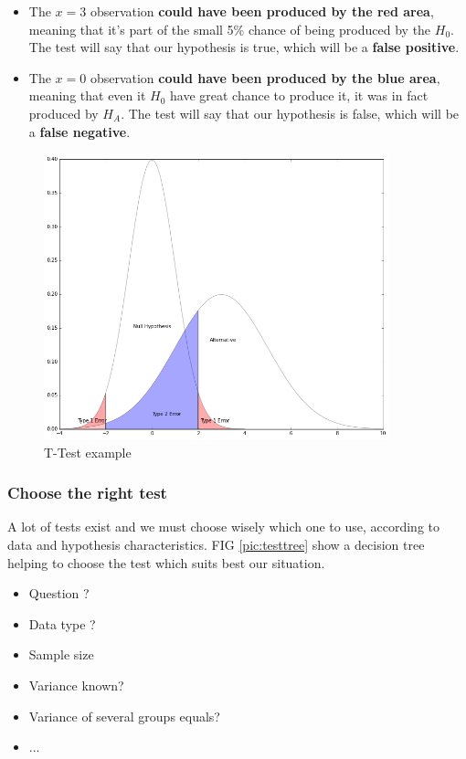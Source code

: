 \begin{itemize}
	\item The $x=3$ observation \textbf{could have been produced by the red area}, meaning that it's part of the small 5\% chance of being produced by the $H_0$. The test will say that our hypothesis is true, which will be a \textbf{false positive}.

	\item The $x=0$ observation \textbf{could have been produced by the blue area}, meaning that even it $H_0$ have great chance to produce it, it was in fact produced by $H_A$.  The test will say that our hypothesis is false, which will be a \textbf{false negative}.
\end{itemize}

\begin{figure}[h]%
 \centering
 \includegraphics[width=10cm]{./pic/t-test}
 \caption{\label{pic:ttest} T-Test example}
\end{figure}

\subsubsection{Choose the right test}

A lot of tests exist and we must choose wisely which one to use, according to data and hypothesis characteristics. FIG \ref{pic:testtree} show a decision tree helping to choose the test which suits best our situation.

\begin{itemize}
 \item Question ? 
 \item Data type ?
 \item Sample size
 \item Variance known? 
 \item Variance of several groups equals?
 \item ...
\end{itemize}

